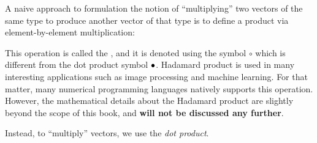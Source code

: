\documentclass{ximera}
\begin{document}
\begin{warning}
  A naive approach to formulation the notion of ``multiplying'' two
  vectors of the same type to produce another vector of that type is
  to define a product via element-by-element multiplication:
  \begin{center}
  \end{center}
  This operation is called the ,
  and it is denoted using the symbol $\circ$ which is different from the
  dot product symbol $\bullet$. Hadamard product is used in many
  interesting applications such as image processing and machine
  learning. For that matter, many numerical programming languages
  natively supports this operation. However, the mathematical details
  about the Hadamard product are slightly beyond the scope of this
  book, and \textbf{will not be discussed any further}.
\end{warning}
 Instead, to ``multiply'' vectors, we use the \textit{dot product}.
\end{document}
